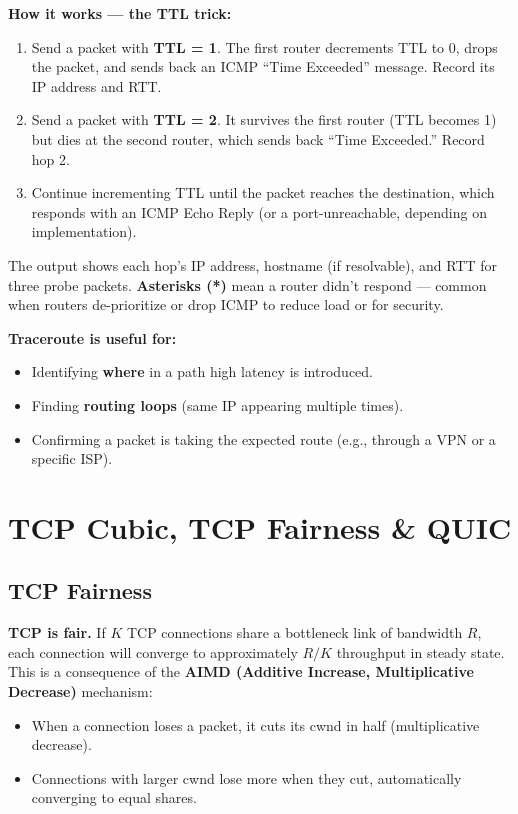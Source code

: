 \documentclass[11pt, letterpaper]{article}
\begin{document}
\textbf{How it works --- the TTL trick:}
\begin{enumerate}[noitemsep]
  \item Send a packet with \textbf{TTL = 1}. The first router decrements TTL to 0, drops the
        packet, and sends back an ICMP ``Time Exceeded'' message. Record its IP address and RTT.
  \item Send a packet with \textbf{TTL = 2}. It survives the first router (TTL becomes 1) but
        dies at the second router, which sends back ``Time Exceeded.'' Record hop 2.
  \item Continue incrementing TTL until the packet reaches the destination, which responds
        with an ICMP Echo Reply (or a port-unreachable, depending on implementation).
\end{enumerate}

The output shows each hop's IP address, hostname (if resolvable), and RTT for three probe
packets. \textbf{Asterisks (*)} mean a router didn't respond --- common when routers
de-prioritize or drop ICMP to reduce load or for security.

\textbf{Traceroute is useful for:}
\begin{itemize}[noitemsep]
  \item Identifying \textbf{where} in a path high latency is introduced.
  \item Finding \textbf{routing loops} (same IP appearing multiple times).
  \item Confirming a packet is taking the expected route (e.g., through a VPN or a specific ISP).
\end{itemize}

\section*{TCP Cubic, TCP Fairness \& QUIC}

\subsection*{TCP Fairness}

\textbf{TCP is fair.} If $K$ TCP connections share a bottleneck link of bandwidth $R$, each
connection will converge to approximately $R/K$ throughput in steady state. This is a
consequence of the \textbf{AIMD (Additive Increase, Multiplicative Decrease)} mechanism:
\begin{itemize}[noitemsep]
  \item When a connection loses a packet, it cuts its cwnd in half (multiplicative decrease).
  \item Connections with larger cwnd lose more when they cut, automatically converging to
        equal shares.
\end{itemize}
\end{document}
